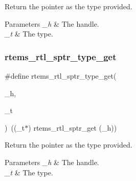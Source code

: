 Return the pointer as the type provided.


\begin{DoxyParams}{Parameters}
{\em \+\_\+h} & The handle. \\
\hline
{\em \+\_\+t} & The type. \\
\hline
\end{DoxyParams}
\mbox{\label{rtl-indirect-ptr_8h_ac64dd5dc1da80a4189154bbc4deda5fc}} 
\subsubsection{\texorpdfstring{rtems\_rtl\_sptr\_type\_get}{rtems\_rtl\_sptr\_type\_get}}
{\footnotesize\ttfamily \#define rtems\+\_\+rtl\+\_\+sptr\+\_\+type\+\_\+get(\begin{DoxyParamCaption}\item[{}]{\+\_\+h,  }\item[{}]{\+\_\+t }\end{DoxyParamCaption})~((\+\_\+t$\ast$) rtems\+\_\+rtl\+\_\+sptr\+\_\+get (\+\_\+h))}

Return the pointer as the type provided.


\begin{DoxyParams}{Parameters}
{\em \+\_\+h} & The handle. \\
\hline
{\em \+\_\+t} & The type. \\
\hline
\end{DoxyParams}
